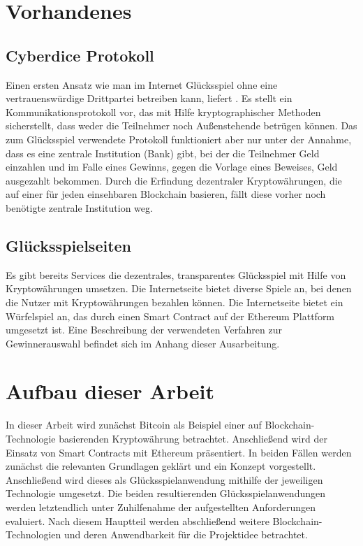 \section{Vorhandenes}

\subsection{Cyberdice Protokoll}

Einen ersten Ansatz wie man im Internet Glücksspiel ohne eine vertrauenswürdige Drittpartei betreiben kann, liefert \cite{cyberdice_paper}. Es stellt ein Kommunikationsprotokoll vor, das mit Hilfe kryptographischer Methoden sicherstellt, dass weder die Teilnehmer noch Außenstehende betrügen können. Das zum Glücksspiel verwendete Protokoll funktioniert aber nur unter der Annahme, dass es eine zentrale Institution (Bank) gibt, bei der die Teilnehmer Geld einzahlen und im Falle eines Gewinns, gegen die Vorlage eines Beweises, Geld ausgezahlt bekommen. Durch die Erfindung dezentraler Kryptowährungen, die auf einer für jeden einsehbaren Blockchain basieren, fällt diese vorher noch benötigte zentrale Institution weg.


\subsection{Glücksspielseiten}
Es gibt bereits Services die dezentrales, transparentes Glücksspiel mit Hilfe von Kryptowährungen umsetzen. Die Internetseite \cite{crypto_games} bietet diverse Spiele an, bei denen die Nutzer mit Kryptowährungen bezahlen können. Die Internetseite \cite{vdice} bietet ein Würfelspiel an, das durch einen Smart Contract auf der Ethereum Plattform umgesetzt ist. Eine Beschreibung der verwendeten Verfahren zur Gewinnerauswahl befindet sich im Anhang dieser Ausarbeitung.

\section{Aufbau dieser Arbeit}
In dieser Arbeit wird zunächst Bitcoin als Beispiel einer auf Blockchain-Technologie basierenden Kryptowährung betrachtet. Anschließend wird der Einsatz von Smart Contracts mit Ethereum präsentiert. In beiden Fällen werden zunächst die relevanten Grundlagen geklärt und ein Konzept vorgestellt. Anschließend wird dieses als Glücksspielanwendung mithilfe der jeweiligen Technologie umgesetzt. Die beiden resultierenden Glücksspielanwendungen werden letztendlich unter Zuhilfenahme der aufgestellten Anforderungen evaluiert. Nach diesem Hauptteil werden abschließend weitere Blockchain-Technologien und deren Anwendbarkeit für die Projektidee betrachtet.